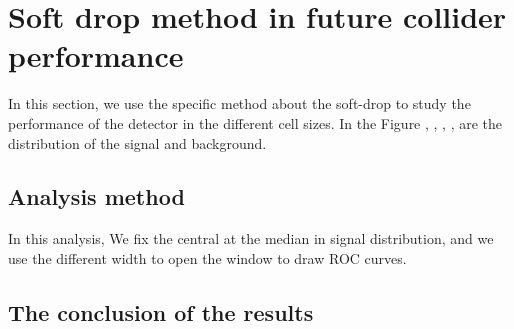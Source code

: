 \documentclass[final,1p,11pt]{elsarticle}
\begin{document}
\section{Soft drop method in future collider performance}
In this section, we use the specific method about the soft-drop to study the performance of the detector in the different cell sizes.  In the Figure , , , , are the distribution of the signal and background. 
\subsection{Analysis method}
In this analysis, We fix the central at the median in signal distribution, and we use the different width to open the window to draw ROC curves.
\subsection{The conclusion of the results}
\end{document}

